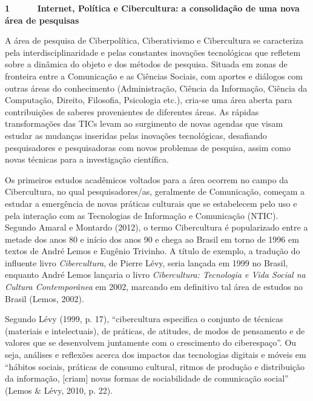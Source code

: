 \textbf{1 ~~~~~Internet, Política e Cibercultura: a consolidação de uma
nova área de pesquisas }

A área de pesquisa de Ciberpolítica, Ciberativismo e Cibercultura se
caracteriza pela interdisciplinaridade e pelas constantes inovações
tecnológicas que refletem sobre a dinâmica do objeto e dos métodos de
pesquisa. Situada em zonas de fronteira entre a Comunicação e as
Ciências Sociais, com aportes e diálogos com outras áreas do
conhecimento (Administração, Ciência da Informação, Ciência da
Computação, Direito, Filosofia, Psicologia etc.), cria-se uma área
aberta para contribuições de saberes provenientes de diferentes áreas.
As rápidas transformações das TICs levam ao surgimento de novas agendas
que visam estudar as mudanças inseridas pelas inovações tecnológicas,
desafiando pesquisadores e pesquisadoras com novos problemas de
pesquisa, assim como novas técnicas para a investigação científica.

Os primeiros estudos acadêmicos voltados para a área ocorrem no campo da
Cibercultura, no qual pesquisadores/as, geralmente de Comunicação,
começam a estudar a emergência de novas práticas culturais que se
estabelecem pelo uso e pela interação com as Tecnologias de Informação e
Comunicação (NTIC). Segundo Amaral e Montardo (2012), o termo
Cibercultura é popularizado entre a metade dos anos 80 e início dos anos
90 e chega ao Brasil em torno de 1996 em textos de André Lemos e Eugênio
Trivinho. A título de exemplo, a tradução do influente livro
\emph{Cibercultura}, de Pierre Lévy, seria lançada em 1999 no Brasil,
enquanto André Lemos lançaria o livro \emph{Cibercultura: Tecnologia e
Vida Social na Cultura Contemporânea} em 2002, marcando em definitivo
tal área de estudos no Brasil (Lemos, 2002).

Segundo Lévy (1999, p. 17), ``cibercultura especifica o conjunto de
técnicas (materiais e intelectuais), de práticas, de atitudes, de modos
de pensamento e de valores que se desenvolvem juntamente com o
crescimento do ciberespaço''. Ou seja, análises e reflexões acerca dos
impactos das tecnologias digitais e móveis em ``hábitos sociais,
práticas de consumo cultural, ritmos de produção e distribuição da
informação, {[}criam{]} novas formas de sociabilidade de comunicação
social'' (Lemos \& Lévy, 2010, p. 22).

